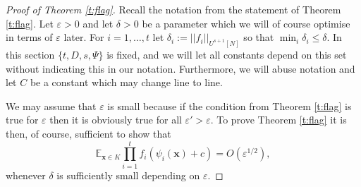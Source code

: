\documentclass[10pt]{article}
\def\eps{\varepsilon}
\def\E{\mathbb{E}}
\newcommand{\vect}[1]{\boldsymbol{#1}}
\begin{document}
\begin{proof}[Proof of Theorem \ref{t:flag}]
Recall the notation from the statement of Theorem \ref{t:flag}. Let $\eps >0$ and let $\delta>0$ be a parameter which we will of course optimise in terms of $\eps$ later. For $i=1, \ldots, t$ let  $\delta_i :=||f_i||_{U^{s+1}[N]}$  so that $\min_i\delta_i\leq  \delta$.  In this section  $\{t,D,s,\Psi\}$ is fixed, and  we will let all constants depend on this set without indicating this in our notation. Furthermore, we will abuse notation and let $C$ be a constant which may change line to line.

We may assume that $\eps$ is small because if the condition from Theorem \ref{t:flag} is true for $\eps$ then it is obviously true for all $\eps'>\eps$. To prove Theorem \ref{t:flag} it is then, of course, sufficient to show that 
\[\E_{\vect x \in K} \prod_{i=1}^t f_i(\psi_i(\vect x)+c) = O(\eps^{1/2}) ,\]
whenever $\delta$ is sufficiently small depending on $\eps$. 


\end{proof}
\end{document}
